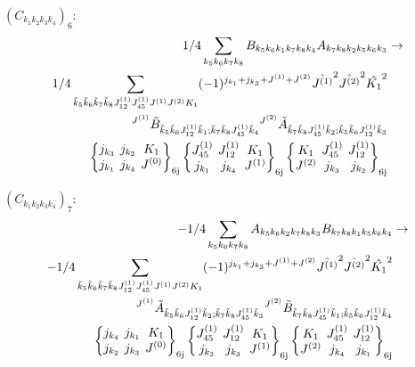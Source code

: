 \documentclass[11pt]{article}
\newcommand{\sixj}[6]{\begingroup\setlength{\arraycolsep}{0.2em}\begin{Bmatrix} #1 & #2 & #3 \\ #4 & #5 & #6 \end{Bmatrix}_{\text{6j}}\endgroup}
\begin{document}
$\left({C}_{{k}_{1}{k}_{2}{k}_{3}{k}_{4}}\right)_{6}$:
\begin{align}
1/4\sum_{{k}_{5}{k}_{6}{k}_{7}{k}_{8}}{B}_{{k}_{5}{k}_{6}{k}_{1}{k}_{7}{k}_{8}{k}_{4}}{A}_{{k}_{7}{k}_{8}{k}_{2}{k}_{5}{k}_{6}{k}_{3}}&\rightarrow \notag \\1/4\sum_{\tilde{k}_{5}\tilde{k}_{6}\tilde{k}_{7}\tilde{k}_{8}J^{(1)}_{12}J^{(1)}_{45}J^{(1)}J^{(2)}K_{1}}(-1)^{j_{{k}_{1}} +j_{{k}_{3}} +J^{(1)} +J^{(2)} }\hat{J^{(1)}}^{2}\hat{J^{(2)}}^{2}\hat{K_{1}}^{2}& \notag \\{}^{J^{(1)}}\tilde{B}_{\tilde{k}_{5}\tilde{k}_{6}J^{(1)}_{12}\tilde{k}_{1};\tilde{k}_{7}\tilde{k}_{8}J^{(1)}_{45}\tilde{k}_{4}}{}^{J^{(2)}}\tilde{A}_{\tilde{k}_{7}\tilde{k}_{8}J^{(1)}_{45}\tilde{k}_{2};\tilde{k}_{5}\tilde{k}_{6}J^{(1)}_{12}\tilde{k}_{3}}& \notag \\\sixj{j_{{k}_{3}}}{j_{{k}_{2}}}{K_{1}}{j_{{k}_{1}}}{j_{{k}_{4}}}{J^{(0)}}\sixj{J^{(1)}_{45}}{J^{(1)}_{12}}{K_{1}}{j_{{k}_{1}}}{j_{{k}_{4}}}{J^{(1)}}\sixj{K_{1}}{J^{(1)}_{45}}{J^{(1)}_{12}}{J^{(2)}}{j_{{k}_{3}}}{j_{{k}_{2}}}
\end{align}

$\left({C}_{{k}_{1}{k}_{2}{k}_{3}{k}_{4}}\right)_{7}$:
\begin{align}
-1/4\sum_{{k}_{5}{k}_{6}{k}_{7}{k}_{8}}{A}_{{k}_{5}{k}_{6}{k}_{2}{k}_{7}{k}_{8}{k}_{3}}{B}_{{k}_{7}{k}_{8}{k}_{1}{k}_{5}{k}_{6}{k}_{4}}&\rightarrow \notag \\-1/4\sum_{\tilde{k}_{5}\tilde{k}_{6}\tilde{k}_{7}\tilde{k}_{8}J^{(1)}_{12}J^{(1)}_{45}J^{(1)}J^{(2)}K_{1}}(-1)^{j_{{k}_{1}} +j_{{k}_{3}} +J^{(1)} +J^{(2)} }\hat{J^{(1)}}^{2}\hat{J^{(2)}}^{2}\hat{K_{1}}^{2}& \notag \\{}^{J^{(1)}}\tilde{A}_{\tilde{k}_{5}\tilde{k}_{6}J^{(1)}_{12}\tilde{k}_{2};\tilde{k}_{7}\tilde{k}_{8}J^{(1)}_{45}\tilde{k}_{3}}{}^{J^{(2)}}\tilde{B}_{\tilde{k}_{7}\tilde{k}_{8}J^{(1)}_{45}\tilde{k}_{1};\tilde{k}_{5}\tilde{k}_{6}J^{(1)}_{12}\tilde{k}_{4}}& \notag \\\sixj{j_{{k}_{4}}}{j_{{k}_{1}}}{K_{1}}{j_{{k}_{2}}}{j_{{k}_{3}}}{J^{(0)}}\sixj{J^{(1)}_{45}}{J^{(1)}_{12}}{K_{1}}{j_{{k}_{2}}}{j_{{k}_{3}}}{J^{(1)}}\sixj{K_{1}}{J^{(1)}_{45}}{J^{(1)}_{12}}{J^{(2)}}{j_{{k}_{4}}}{j_{{k}_{1}}}
\end{align}
\end{document}
